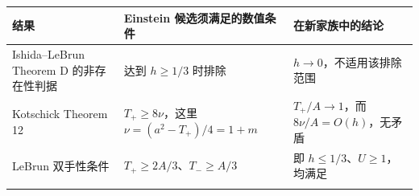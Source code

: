 \documentclass[
  10pt,
]{article}
\begin{document}
\begin{longtable}[]{@{}>{\raggedright\arraybackslash}p{\dimexpr(\linewidth-4\tabcolsep)/3\relax}>{\raggedright\arraybackslash}p{\dimexpr(\linewidth-4\tabcolsep)/3\relax}>{\raggedright\arraybackslash}p{\dimexpr(\linewidth-4\tabcolsep)/3\relax}@{}}
\toprule
\begin{minipage}[b]{0.30\columnwidth}\raggedright
结果\strut
\end{minipage} & \begin{minipage}[b]{0.30\columnwidth}\raggedright
Einstein 候选须满足的数值条件\strut
\end{minipage} & \begin{minipage}[b]{0.30\columnwidth}\raggedright
在新家族中的结论\strut
\end{minipage}\tabularnewline
\midrule
\endhead
\begin{minipage}[t]{0.30\columnwidth}\raggedright
Ishida--LeBrun Theorem D 的非存在性判据\strut
\end{minipage} & \begin{minipage}[t]{0.30\columnwidth}\raggedright
达到 \(h\ge1/3\) 时排除\strut
\end{minipage} & \begin{minipage}[t]{0.30\columnwidth}\raggedright
\(h\to0\)，不适用该排除范围\strut
\end{minipage}\tabularnewline
\begin{minipage}[t]{0.30\columnwidth}\raggedright
Kotschick Theorem 12\strut
\end{minipage} & \begin{minipage}[t]{0.30\columnwidth}\raggedright
\(T_+\ge8\nu\)，这里 \(\nu=(a^2-T_+)/4=1+m\)\strut
\end{minipage} & \begin{minipage}[t]{0.30\columnwidth}\raggedright
\(T_+/A\to1\)，而 \(8\nu/A=O(h)\)，无矛盾\strut
\end{minipage}\tabularnewline
\begin{minipage}[t]{0.30\columnwidth}\raggedright
LeBrun 双手性条件\strut
\end{minipage} & \begin{minipage}[t]{0.30\columnwidth}\raggedright
\(T_+\ge2A/3\)、\(T_-\ge A/3\)\strut
\end{minipage} & \begin{minipage}[t]{0.30\columnwidth}\raggedright
即 \(h\le1/3\)、\(U\ge1\)，均满足\strut
\end{minipage}\tabularnewline
\begin{minipage}[t]{0.30\columnwidth}\raggedright

\end{minipage}
\end{longtable}
\end{document}
